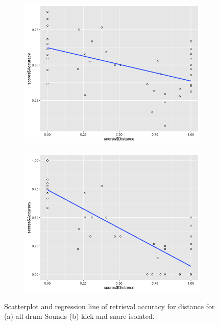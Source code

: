 \begin{figure}
\centering
\begin{subfigure}[b]{0.75\textwidth}
   \includegraphics[width=1\linewidth]{ch07_evaluation/figures/overall_correlation.png}
   \caption{}
   \label{fig:corr1} 
\end{subfigure}

\begin{subfigure}[b]{0.75\textwidth}
   \includegraphics[width=1\linewidth]{ch07_evaluation/figures/kick_snare_correlation.png}
   \caption{}
   \label{fig:corr2}
\end{subfigure}

\caption[Scatterplot and regression lines of retrieval accuracy.]{Scatterplot and regression line of retrieval accuracy for distance for (a) all drum Sounds (b) kick and snare isolated.}
\end{figure}

